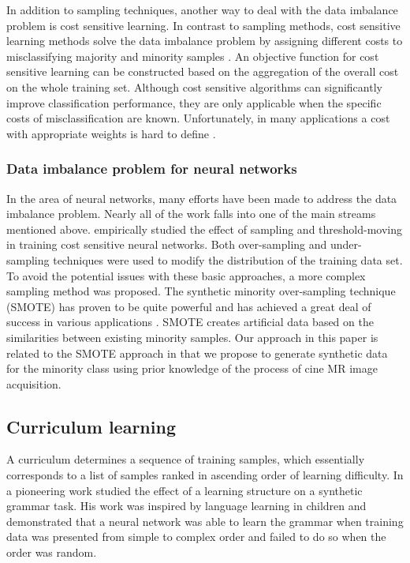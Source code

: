 \documentclass[preprint,12pt,authoryear]{elsarticle}
\begin{document}
In addition to sampling techniques, another way to deal with the data imbalance problem is cost sensitive learning. In contrast to sampling methods, cost sensitive learning methods solve the data imbalance problem by assigning different costs to misclassifying majority and minority samples \citep{Khan2018}. An objective function for cost sensitive learning can be constructed based on the aggregation of the overall cost on the whole training set.
Although cost sensitive algorithms can significantly improve classification performance, they are only applicable when the specific costs of misclassification are known. Unfortunately, in many applications a cost with appropriate weights is hard  to define \citep{Maloof2003}.

\subsubsection{Data imbalance problem for neural networks}

In the area of neural networks, many efforts have been made  to address the data imbalance problem. Nearly all of the work falls into one of the main streams mentioned above.
\cite{Zhou2006} empirically studied the effect of sampling and threshold-moving in training cost sensitive  neural  networks. Both over-sampling  and  under-sampling techniques were used to modify the distribution of the training  data  set. To avoid the potential issues with these basic approaches, a more complex sampling method was proposed. The synthetic minority over-sampling technique (SMOTE) has proven to be quite powerful and has achieved a great deal of success in various applications \citep{Han2005}. SMOTE creates artificial data based on the similarities between existing minority samples.
Our approach in this paper is related to the SMOTE approach in that we propose to generate synthetic data for the minority class using prior knowledge of the process of cine MR image acquisition.

\subsection{Curriculum learning}
\label{sec:curriculumintro}

A curriculum determines a sequence of training samples, which essentially corresponds to a list of samples ranked in ascending order of learning difficulty.
In a pioneering work \cite{Elman1993} studied the effect of a learning structure on a synthetic grammar task. His work was inspired  by  language  learning  in  children  and  demonstrated that a neural network was able  to  learn  the  grammar when training data was presented from simple to complex order and failed to do so when the order was random.\\
\end{document}
